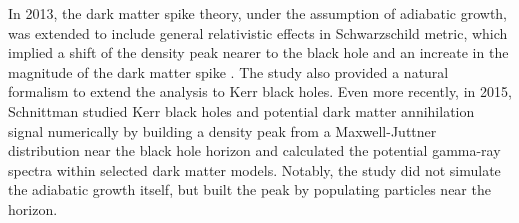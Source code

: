 \documentclass[12pt]{article}
\begin{document}


% 



In 2013, the dark matter spike theory, under the assumption of adiabatic growth, 
was extended to include general relativistic effects in Schwarzschild metric, 
which implied a shift of the density peak nearer to the black hole  
and an increate in the magnitude of the dark matter spike 
\citep{Sadeghian_Ferrer_Will_2013}. The study
also provided a natural formalism to extend the analysis to 
Kerr black holes. Even more recently, in 2015, Schnittman 
studied Kerr black holes and potential dark matter annihilation signal 
numerically by building a density peak from a Maxwell-Juttner 
distribution near the black hole horizon and calculated 
the potential gamma-ray spectra within selected 
dark matter models. 
Notably, the study did not simulate the adiabatic 
growth itself, but built the peak by populating particles 
near the horizon.
\end{document}
